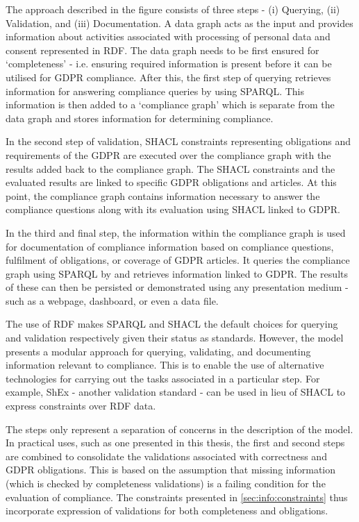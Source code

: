 The approach described in the figure consists of three steps - (i) Querying, (ii) Validation, and (iii) Documentation. A data graph acts as the input and provides information about activities associated with processing of personal data and consent represented in RDF. The data graph needs to be first ensured for `completeness' - i.e. ensuring required information is present before it can be utilised for GDPR compliance.
After this, the first step of querying retrieves information for answering compliance queries by using SPARQL. This information is then added to a `compliance graph' which is separate from the data graph and stores information for determining compliance.

In the second step of validation, SHACL constraints representing obligations and requirements of the GDPR are executed over the compliance graph with the results added back to the compliance graph.
The SHACL constraints and the evaluated results are linked to specific GDPR obligations and articles.
At this point, the compliance graph contains information necessary to answer the compliance questions along with its evaluation using SHACL linked to GDPR.

In the third and final step, the information within the compliance graph is used for documentation of compliance information based on compliance questions, fulfilment of obligations, or coverage of GDPR articles. It queries the compliance graph using SPARQL by and retrieves information linked to GDPR.
The results of these can then be persisted or demonstrated using any presentation medium - such as a webpage, dashboard, or even a data file.

The use of RDF makes SPARQL and SHACL the default choices for querying and validation respectively given their status as standards.
However, the model presents a modular approach for querying, validating, and documenting information relevant to compliance. This is to enable the use of alternative technologies for carrying out the tasks associated in a particular step. 
For example, ShEx - another validation standard - can be used in lieu of SHACL to express constraints over RDF data.

The steps only represent a separation of concerns in the description of the model.
In practical uses, such as one presented in this thesis, the first and second steps are combined to consolidate the validations associated with correctness and GDPR obligations.
This is based on the assumption that missing information (which is checked by completeness validations) is a failing condition for the evaluation of compliance.
The constraints presented in \autoref{sec:info:constraints} thus incorporate expression of validations for both completeness and obligations.


